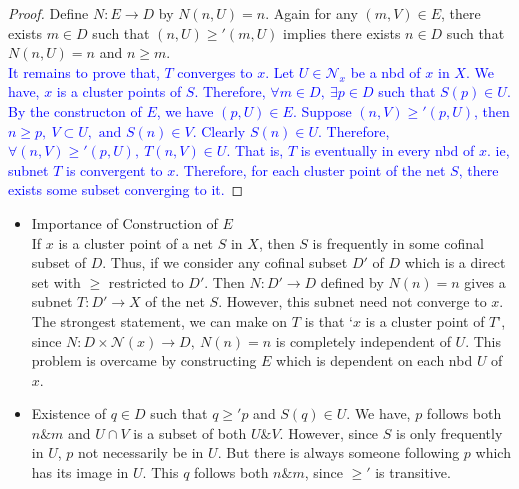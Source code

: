 \begin{proof}
	Define $N : E \to D$ by $N(n,U) = n$. Again for any $(m,V) \in E$, there exists $m \in D$ such that $(n,U) \ge' (m,U)$ implies there exists $n \in D$ such that  $N(n,U) = n$ and $n \ge m$.\\
	
	\textcolor{blue}{It remains to prove that, $T$ converges to $x$. Let $U \in \mathcal{N}_x$ be a nbd of $x$ in $X$. We have, $x$ is a cluster points of $S$. Therefore, $\forall m \in D,\ \exists p \in D$ such that $S(p) \in U$. By the constructon of $E$, we have $(p,U) \in E$. Suppose $(n,V) \ge' (p,U)$, then $n \ge p,\ V \subset U, \text{ and } S(n) \in V$. Clearly $S(n) \in U$. Therefore, $\forall (n,V) \ge' (p,U),\ T(n,V) \in U$. That is, $T$ is eventually in every nbd of $x$. ie, subnet $T$ is convergent to $x$. Therefore, for each cluster point of the net $S$, there exists some subset converging to it.}
\end{proof}

\begin{remark}
\begin{commentary}
	\begin{itemize}
		\item  Importance of Construction of $E$\\ If $x$ is a cluster point of a net $S$ in $X$, then $S$ is frequently in some cofinal subset of $D$. Thus, if we consider any cofinal subset $D'$ of $D$ which is a direct set with $\ge$ restricted to $D'$. Then $N : D' \to D$ defined by $N(n)=n$ gives a subnet $T : D' \to X$ of the net $S$. However, this subnet need not converge to $x$. The strongest statement, we can make on $T$ is that `$x$ is a cluster point of $T$', since $N : D \times \mathcal{N}(x) \to D,\ N(n) = n$ is completely independent of $U$. This problem is overcame by constructing $E$ which is dependent on each nbd $U$ of $x$.
		\item Existence of $q \in D$ such that $q \ge' p$ and $S(q) \in U$. We have, $p$ follows both $n \& m$ and $U \cap V$ is a subset of both $U \& V$. However, since $S$ is only frequently in $U$, $p$ not necessarily be in $U$. But there is always someone following $p$ which has its image in $U$. This $q$ follows both $n \& m$, since $\ge'$ is transitive.
	\end{itemize}
\end{commentary}
\end{remark}


